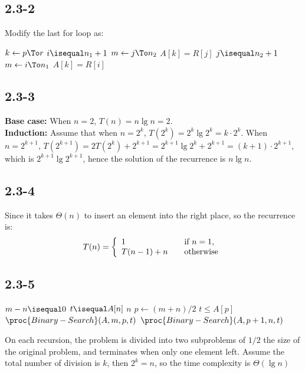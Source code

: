 \subsection{2.3-2}
    Modify the last for loop as:
    \begin{codebox}
    \li \For $k \gets p \To r$
        \Do
    \li     \If $i \isequal n_1+1$
            \Then
    \li         \For $m \gets j \To n_2$
                \Do
    \li             $A[k] = R[j]$
                \End
    \li         {}
            \End
    \li     \If $j \isequal n_2+1$
            \Then
    \li         \For $m \gets i \To n_1$
                \Do
    \li             $A[k] = R[i]$
                \End
    \li         {}
            \End
        \End
    \end{codebox}
\subsection{2.3-3}
    \textbf{Base case:} When $n=2$, $T(n)=n \lg n=2$. \\
    \textbf{Induction:} Assume that when
    $n=2^k$, $T(2^k)=2^k \lg 2^k=k\cdot2^k$. When $n=2^{k+1}$,
    $T(2^{k+1})=2T(2^k)+2^{k+1}=2^{k+1} \lg 2^k + 2^{k+1}=(k+1)\cdot 2^{k+1}$,
    which is $2^{k+1}\lg 2^{k+1}$, hence the solution of the recurrence is
    $n\lg n$.
\subsection{2.3-4}
    Since it takes $\Theta(n)$ to insert an element into the right place, so
    the recurrence is:
    \begin{displaymath}
        T(n) = \left\{
        \begin{array}{l l}
            1   & \quad \text{if $n=1$,}\\
            T(n-1) + n & \quad \text{otherwise}
        \end{array}
        \right.
    \end{displaymath}
\subsection{2.3-5}
    \begin{codebox}
    \li \If $m-n \isequal 0$
        \Then
    \li     \If $t \isequal A[n]$
            \Then
    \li         \Return $n$
    \li     \Else
    \li         \Return {}
            \End
        \End
    \li $p \gets (m+n)/2$
    \li \If $t \le A[p]$
        \Then
    \li     \Return $\proc{Binary-Search}(A,m,p,t)$
    \li \Else
    \li     \Return $\proc{Binary-Search}(A,p+1,n,t)$
        \End
    \end{codebox}
    On each recursion, the problem is divided into two subproblems of $1/2$ the
    size of the original problem, and terminates when only one element left.
    Assume the total number of division is $k$, then $2^k=n$, so the time
    complexity is $\Theta(\lg n)$
